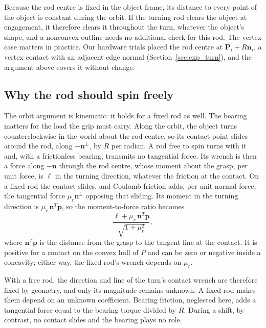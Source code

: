Because the rod centre is fixed in the object frame, its distance to every point of the object is constant during the orbit. If the turning rod clears the object at engagement, it therefore clears it throughout the turn, whatever the object's shape, and a nonconvex outline needs no additional check for this rod. The vertex case matters in practice. Our hardware trials placed the rod centre at $\mathbf P_i+R\mathbf n_i$, a vertex contact with an adjacent edge normal (Section~\ref{sec:exp_turn}), and the argument above covers it without change.

\subsection{Why the rod should spin freely}
\label{sec:freerod}

The orbit argument is kinematic: it holds for a fixed rod as well. The bearing matters for the load the grip must carry. Along the orbit, the object turns counterclockwise in the world about the rod centre, so its contact point slides around the rod, along $-\mathbf n^\perp$, by $R$ per radian. A rod free to spin turns with it and, with a frictionless bearing, transmits no tangential force. Its wrench is then a force along $-\mathbf n$ through the rod centre, whose moment about the grasp, per unit force, is $\ell$ in the turning direction, whatever the friction at the contact. On a fixed rod the contact slides, and Coulomb friction adds, per unit normal force, the tangential force $\mu_r\mathbf n^\perp$ opposing that sliding. Its moment in the turning direction is $\mu_r\,\mathbf n^T\mathbf p$, so the moment-to-force ratio becomes
\begin{equation}
  \frac{\ell+\mu_r\,\mathbf n^T\mathbf p}{\sqrt{1+\mu_r^2}},
  \label{eq:fixedrod}
\end{equation}
where $\mathbf n^T\mathbf p$ is the distance from the grasp to the tangent line at the contact. It is positive for a contact on the convex hull of $P$ and can be zero or negative inside a concavity; either way, the fixed rod's wrench depends on $\mu_r$.

With a free rod, the direction and line of the turn's contact wrench are therefore fixed by geometry, and only its magnitude remains unknown. A fixed rod makes them depend on an unknown coefficient. Bearing friction, neglected here, adds a tangential force equal to the bearing torque divided by $R$. During a shift, by contrast, no contact slides and the bearing plays no role.

